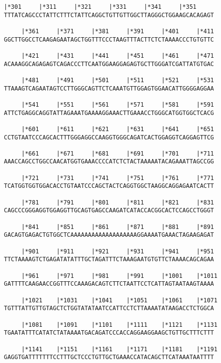 \documentclass{article}
\begin{document}
\begin{Verbatim}[fontfamily=courier]
     |*301     |*311     |*321     |*331     |*341     |*351
TTTATCAGCCCTATTCTTTCTATTCAGGCTGTTGTTGGCTTAGGGCTGGAAGCACAGAGT

     |*361     |*371     |*381     |*391     |*401     |*411
GGCTTGGCCTCAAGAGAATAGCTGGTTTCCCTAAGTTTACTTCTCTAAAACCCTGTGTTC

     |*421     |*431     |*441     |*451     |*461     |*471
ACAAAGGCAGAGAGTCAGACCCTTCAATGGAAGGAGAGTGCTTGGGATCGATTATGTGAC

     |*481     |*491     |*501     |*511     |*521     |*531
TTAAAGTCAGAATAGTCCTTGGGCAGTTCTCAAATGTTGGAGTGGAACATTGGGGAGGAA

     |*541     |*551     |*561     |*571     |*581     |*591
ATTCTGAGGCAGGTATTAGAAATGAAAAGGAAACTTGAAACCTGGGCATGGTGGCTCACG

     |*601     |*611     |*621     |*631     |*641     |*651
CCTGTAATCCCAGCACTTTGGGAGGCCAAGGTGGGCAGATCACTGGAGGTCAGGAGTTCG

     |*661     |*671     |*681     |*691     |*701     |*711
AAACCAGCCTGGCCAACATGGTGAAACCCCATCTCTACTAAAAATACAGAAATTAGCCGG

     |*721     |*731     |*741     |*751     |*761     |*771
TCATGGTGGTGGACACCTGTAATCCCAGCTACTCAGGTGGCTAAGGCAGGAGAATCACTT

     |*781     |*791     |*801     |*811     |*821     |*831
CAGCCCGGGAGGTGGAGGTTGCAGTGAGCCAAGATCATACCACGGCACTCCAGCCTGGGT

     |*841     |*851     |*861     |*871     |*881     |*891
GACAGTGAGACTGTGGCTCAAAAAAAAAAAAAAAAAAAGGAAAATGAAACTAGAAGAGAT

     |*901     |*911     |*921     |*931     |*941     |*951
TTCTAAAAGTCTGAGATATATTTGCTAGATTTCTAAAGAATGTGTTCTAAAACAGCAGAA

     |*961     |*971     |*981     |*991     |*1001    |*1011
GATTTTCAAGAACCGGTTTCCAAAGACAGTCTTCTAATTCCTCATTAGTAATAAGTAAAA

     |*1021    |*1031    |*1041    |*1051    |*1061    |*1071
TGTTTATTGTTGTAGCTCTGGTATATAATCCATTCCTCTTAAAATATAAGACCTCTGGCA

     |*1081    |*1091    |*1101    |*1111    |*1121    |*1131
TGAATATTTCATATCTATAAAATGACAGATCCCACCAGGAAGGAAGCTGTTGCTTTCTTT

     |*1141    |*1151    |*1161    |*1171    |*1181    |*1191
GAGGTGATTTTTTTCCTTTGCTCCCTGTTGCTGAAACCATACAGCTTCATAAATAATTTT

\end{Verbatim}
\newpage
\end{document}
